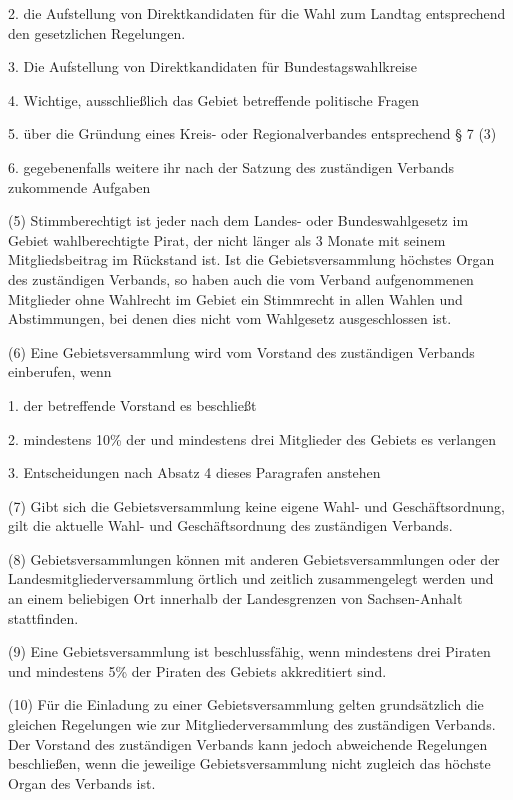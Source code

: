 {2. die Aufstellung von Direktkandidaten für die Wahl zum Landtag entsprechend den gesetzlichen Regelungen.

3. Die Aufstellung von Direktkandidaten für Bundestagswahlkreise

4. Wichtige, ausschließlich das Gebiet betreffende politische Fragen

5. über die Gründung eines Kreis- oder Regionalverbandes entsprechend § 7 (3)

6. gegebenenfalls weitere ihr nach der Satzung des zuständigen Verbands zukommende Aufgaben

(5) Stimmberechtigt ist jeder nach dem Landes- oder Bundeswahlgesetz im Gebiet wahlberechtigte Pirat, der nicht länger als 3 Monate mit seinem Mitgliedsbeitrag im Rückstand ist. Ist die Gebietsversammlung höchstes Organ des zuständigen Verbands, so haben auch die vom Verband aufgenommenen Mitglieder ohne Wahlrecht im Gebiet ein Stimmrecht in allen Wahlen und Abstimmungen, bei denen dies nicht vom Wahlgesetz ausgeschlossen ist.

(6) Eine Gebietsversammlung wird vom Vorstand des zuständigen Verbands einberufen, wenn

1. der betreffende Vorstand es beschließt

2. mindestens 10\% der und mindestens drei Mitglieder des Gebiets es verlangen

3. Entscheidungen nach Absatz 4 dieses Paragrafen anstehen

(7) Gibt sich die Gebietsversammlung keine eigene Wahl- und Geschäftsordnung, gilt die aktuelle Wahl- und Geschäftsordnung des zuständigen Verbands.

(8) Gebietsversammlungen können mit anderen Gebietsversammlungen oder der Landesmitgliederversammlung örtlich und zeitlich zusammengelegt werden und an einem beliebigen Ort innerhalb der Landesgrenzen von Sachsen-Anhalt stattfinden.

(9) Eine Gebietsversammlung ist beschlussfähig, wenn mindestens drei Piraten und mindestens 5\% der Piraten des Gebiets akkreditiert sind.

(10) Für die Einladung zu einer Gebietsversammlung gelten grundsätzlich die gleichen Regelungen wie zur Mitgliederversammlung des zuständigen Verbands. Der Vorstand des zuständigen Verbands kann jedoch abweichende Regelungen beschließen, wenn die jeweilige Gebietsversammlung nicht zugleich das höchste Organ des Verbands ist.}

